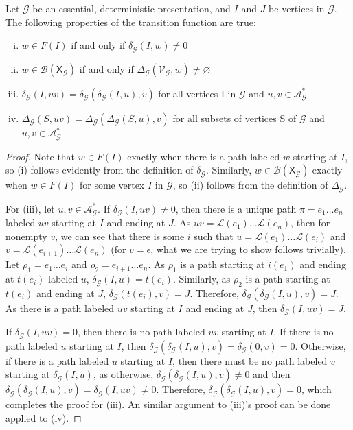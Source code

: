 \documentclass[hidelinks]{report}
\newcommand{\Ac}{\mathcal{A}}  %
\newcommand{\Lc}{\mathcal{L}}  %
\newcommand{\Gc}{\mathcal{G}}  %
\newcommand{\Vc}{\mathcal{V}}
\newcommand{\Bc}{\mathcal{B}}
\newcommand{\shift}[1]{\mathsf{X}_{#1}}
\theoremstyle{definition}
\begin{document}
\begin{proposition}\label{deltaprops}
    Let \(\Gc\) be an essential, deterministic presentation, and \(I\) and \(J\) be vertices in \(\Gc\). The following properties of the 
    transition function are true:

    \begin{enumerate}[(i)]
        \item \(w \in F(I)\) if and only if \(\delta_\Gc(I, w) \neq 0\)
        \item \(w \in \Bc(\shift\Gc)\) if and only if \(\Delta_\Gc(\Vc_\Gc, w) \neq \varnothing\)
        \item \(\delta_\Gc(I, uv) = \delta_\Gc(\delta_\Gc(I, u), v)\) for all vertices I in \(\Gc\) and \(u, v \in \Ac_\Gc^*\)
        \item \(\Delta_\Gc(S, uv) = \Delta_\Gc(\Delta_\Gc(S, u), v)\) for all subsets of vertices S of \(\Gc\) and \(u, v \in \Ac_\Gc^*\)
    \end{enumerate}
\end{proposition}

\begin{proof}
    Note that \(w \in F(I)\) exactly when there is a path labeled \(w\) starting at \(I\), so (i) follows 
    evidently from the definition of \(\delta_\Gc\). Similarly, \(w \in \Bc(\shift{\Gc})\) exactly 
    when \(w \in F(I)\) for some vertex \(I\) in \(\Gc\), so (ii) follows from the definition of \(\Delta_\Gc\).

    For (iii), let \(u, v \in \Ac_\Gc^*\). If \(\delta_\Gc(I, uv) \neq 0\), then there is a unique path \(\pi=e_1 \dots e_n\) 
    labeled \(uv\) starting at \(I\) and ending at \(J\). As \(uv = \Lc(e_1) \dots \Lc(e_n)\), then for 
    nonempty \(v\), we can see that
    there is some \(i\) such that \(u = \Lc(e_1) \dots \Lc(e_i)\) and 
    \(v = \Lc(e_{i+1}) \dots \Lc(e_n)\)
    (for \(v = \epsilon\), what we are trying to show follows trivially). Let \(\rho_1 = e_1 \dots e_i\) and \(\rho_2 = e_{i+1} \dots e_n\).
    As \(\rho_1\) is a path starting at \(i(e_1)\) and ending at \(t(e_i)\) labeled \(u\),
    \(\delta_\Gc(I, u) = t(e_i)\). Similarly, as \(\rho_2\) is a path starting 
    at \(t(e_i)\) and ending at \(J\), \(\delta_\Gc(t(e_i), v) = J\). Therefore, 
    \(\delta_\Gc(\delta_\Gc(I, u), v) = J\). As there is a path labeled \(uv\)
    starting at \(I\) and ending at \(J\), then \(\delta_\Gc(I, uv) = J\). 
    
    If \(\delta_\Gc(I, uv) = 0\), 
    then there is no path labeled \(uv\) starting at \(I\). If there is no path 
    labeled \(u\) starting at \(I\), then \(\delta_\Gc(\delta_\Gc(I, u), v) = \delta_\Gc(0, v) = 0\).
    Otherwise, if there is a path labeled \(u\) starting at \(I\), then there must 
    be no path labeled \(v\) starting at \(\delta_\Gc(I, u)\), as otherwise, 
    \(\delta_\Gc(\delta_\Gc(I, u), v) \neq 0\) and then 
    \(\delta_\Gc(\delta_\Gc(I, u), v) = \delta_\Gc(I, uv) \neq 0\). Therefore, \(\delta_\Gc(\delta_\Gc(I, u), v) = 0\),
    which completes the proof for (iii). An similar argument to (iii)'s proof can be done applied to (iv).
\end{proof}
\end{document}
